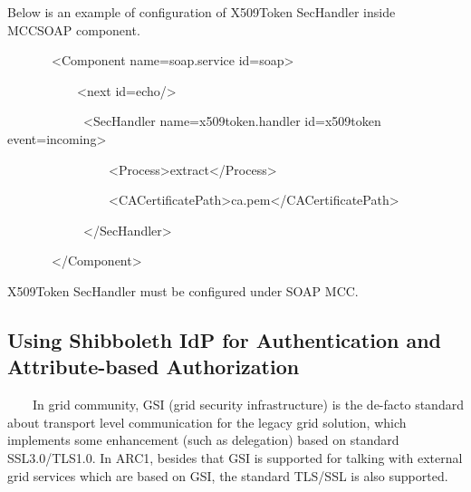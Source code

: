 \documentclass{article}
\begin{document}
{\upshape\color{black}
Below is an example of configuration of X509Token SecHandler inside
MCCSOAP component.}

{\ttfamily\color{black}
\ \ \ \ \ \ \ {\textless}Component
name={\textquotedbl}soap.service{\textquotedbl}
id={\textquotedbl}soap{\textquotedbl}{\textgreater}}

{\ttfamily\color{black}
\ \ \ \ \ \ \ \ \ \ \ {\textless}next
id={\textquotedbl}echo{\textquotedbl}/{\textgreater}}

{\ttfamily\color{black}
\ \ \ \ \ \ \ \ \ \ \ \ {\textless}SecHandler
name={\textquotedbl}x509token.handler{\textquotedbl}
id={\textquotedbl}x509token{\textquotedbl}
event={\textquotedbl}incoming{\textquotedbl}{\textgreater}}


\bigskip

{\ttfamily\color{black}
\ \ \ \ \ \ \ \ \ \ \ \ \ \ \ \ {\textless}Process{\textgreater}extract{\textless}/Process{\textgreater}}


\bigskip

{\ttfamily\color{black}
\ \ \ \ \ \ \ \ \ \ \ \ \ \ \ \ {\textless}CACertificatePath{\textgreater}ca.pem{\textless}/CACertificatePath{\textgreater}}


\bigskip

{\ttfamily\color{black}
\ \ \ \ \ \ \ \ \ \ \ \ {\textless}/SecHandler{\textgreater}}


\bigskip

{\ttfamily\color{black}
\ \ \ \ \ \ \ {\textless}/Component{\textgreater}}

{\color{black}
X509Token SecHandler must be configured under SOAP MCC.}


\bigskip

\subsection[Using Shibboleth IdP for Authentication and Attribute-based
Authorization]{Using \foreignlanguage{english}{Shibboleth} IdP for
Authentication and Attribute-based Authorization}
{\color{black}
\ \ \ \ In grid community, GSI (grid security infrastructure) is the
de-facto standard about transport level communication for the legacy
grid solution, which implements some enhancement (such as delegation)
based on standard SSL3.0/TLS1.0. In ARC1, besides that GSI is supported
for talking with external grid services which are based on GSI, the
standard TLS/SSL is also supported.}
\end{document}

